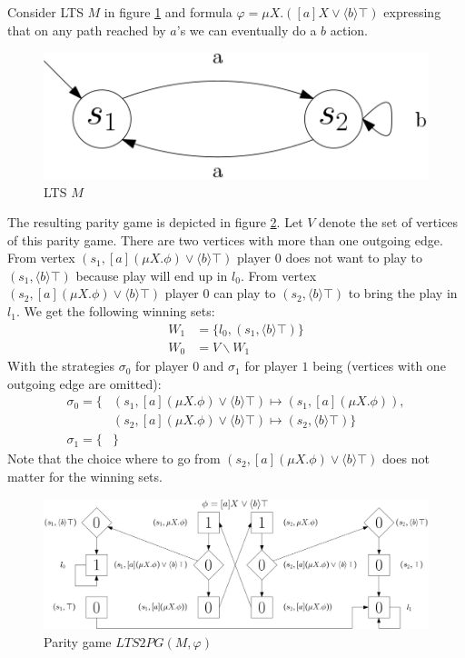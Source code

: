 \begin{example}
	Consider LTS $M$ in figure \ref{fig:exverltsprojempty} and formula $\varphi = \mu X.([a]X \vee \langle b \rangle \top)$ expressing that on any path reached by $a$'s we can eventually do a $b$ action.
	\begin{figure}[h]
		\centering
		\includegraphics[scale=0.3]{Examples/ExamleVerification/LTSprojempty}
		\caption[LTS $M$]{LTS $M$}
		\label{fig:exverltsprojempty}
	\end{figure}

	The resulting parity game is depicted in figure \ref{fig:exverpg}. Let $V$ denote the set of vertices of this parity game. There are two vertices with more than one outgoing edge. From vertex $(s_1, [a](\mu X.\phi) \vee \langle b \rangle \top)$ player 0 does not want to play to $(s_1, \langle b \rangle \top)$ because play will end up in $l_0$. From vertex $(s_2, [a](\mu X.\phi)  \vee \langle b \rangle \top)$ player 0 can play to $(s_2, \langle b \rangle \top)$ to bring the play in $l_1$. We get the following winning sets:
	\begin{align*}
	W_1 &= \{ l_0, (s_1, \langle b \rangle \top )\}\\
	W_0 &= V \backslash W_1
	\end{align*}
	With the strategies $\sigma_0$ for player $0$ and $\sigma_1$ for player $1$ being (vertices with one outgoing edge are omitted):
	\begin{align*}
	\sigma_0 = \{
	&(s_1, [a](\mu X. \phi) \vee \langle b \rangle \top) \mapsto (s_1, [a] (\mu X. \phi)), \\
	&(s_2, [a](\mu X. \phi) \vee \langle b \rangle \top) \mapsto (s_2, \langle b \rangle \top) \} \\
	\sigma_1 = \{&\}
	\end{align*}
	Note that the choice where to go from $(s_2, [a](\mu X.\phi) \vee \langle b \rangle \top)$ does not matter for the winning sets.
	\begin{figure}[h]
		\centering
		\includegraphics[scale=0.3]{Examples/ExamleVerification/PG}
		\caption[Parity game $LTS2PG(M, \varphi)$]{Parity game $LTS2PG(M, \varphi)$}
		\label{fig:exverpg}
	\end{figure}
\end{example}

